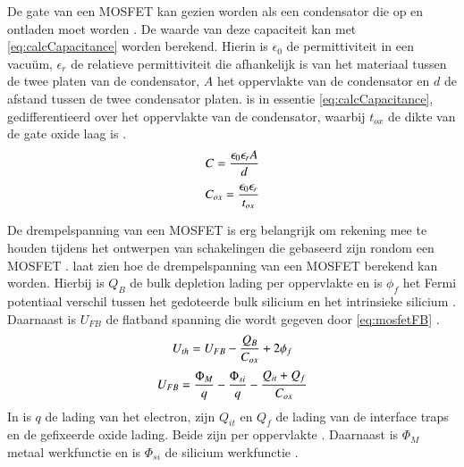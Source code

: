 De gate van een MOSFET kan gezien worden als een condensator die op en ontladen moet worden \cite{DonaldNeamenSemiconductorPhysicsAndDevicesBasicPrinciples}. De waarde van deze capaciteit kan met \cref{eq:calcCapacitance} worden berekend. Hierin is $\epsilon_0$ de permittiviteit in een vacuüm, $\epsilon_r$ de relatieve permittiviteit die afhankelijk is van het materiaal tussen de twee platen van de condensator, $A$ het oppervlakte van de condensator en $d$ de afstand tussen de twee condensator platen.  is in essentie \cref{eq:calcCapacitance}, gedifferentieerd over het oppervlakte van de condensator, waarbij $t_{ox}$ de dikte van de gate oxide laag is \cite{DonaldNeamenSemiconductorPhysicsAndDevicesBasicPrinciples}.
\begin{equation} \label{eq:calcCapacitance}
    C=\frac{\epsilon_0\epsilon_rA}{d}
    \tagaddtext{[\si{\farad}]}
\end{equation}
\begin{equation}\label{eq:calcCox}
    C_{ox}=\frac{\epsilon_0\epsilon_r}{t_{ox}}
    \tagaddtext{[\si{\farad\,\meter^{-2}}]}
\end{equation}

De drempelspanning van een MOSFET is erg belangrijk om rekening mee te houden tijdens het ontwerpen van schakelingen die gebaseerd zijn rondom een MOSFET \cite{inleidingInDeElektronicaWissenburgh,DonaldNeamenSemiconductorPhysicsAndDevicesBasicPrinciples,verhoeven2007structured}.  laat zien hoe de drempelspanning van een MOSFET berekend kan worden. Hierbij is $Q_B$ de bulk depletion lading per oppervlakte en is $\phi_f$ het Fermi potentiaal verschil tussen het gedoteerde bulk silicium en het intrinsieke silicium \cite{bergveld1985impactOfMosfetBasedSensors}. Daarnaast is $U_{FB}$ de flatband spanning die wordt gegeven door \cref{eq:mosfetFB} \cite{bergveld1985impactOfMosfetBasedSensors,isfetAsAnElectronicDevice,DonaldNeamenSemiconductorPhysicsAndDevicesBasicPrinciples,bergveld2003thirtyYearsISFET}.
\begin{equation} \label{eq:mosfetUth}
    U_{th}=U_{FB}-\frac{Q_B}{C_{ox}}+2\phi_f
    \tagaddtext{[\si{\volt}]}
\end{equation}
\begin{equation} \label{eq:mosfetFB}
    U_{FB}=\frac{\Phi_M}{q}-\frac{\Phi_{si}}{q}-\frac{Q_{it}+Q_f}{C_{ox}}
    \tagaddtext{[\si{\volt}]}
\end{equation}
In  is $q$ de lading van het electron, zijn $Q_{it}$ en $Q_f$ de lading van de interface traps en de gefixeerde oxide lading. Beide zijn per oppervlakte \cite{bergveld1985impactOfMosfetBasedSensors}. Daarnaast is $\Phi_M$ metaal werkfunctie en is $\Phi_{si}$ de silicium werkfunctie \cite{bergveld1985impactOfMosfetBasedSensors,bergveld2003thirtyYearsISFET}.

